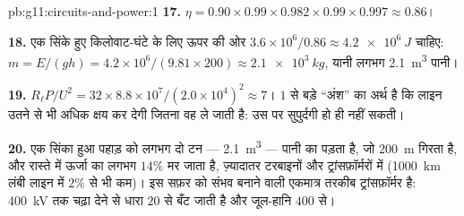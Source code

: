 \begin{solution}{pb:g11:circuits-and-power:1}
\textbf{17.} $\eta = 0.90 \times 0.99 \times 0.982 \times 0.99 \times
0.997 \approx 0.86$।

\textbf{18.} एक सिंके हुए किलोवाट-घंटे के लिए ऊपर की ओर $3.6\times10^{6}/0.86
\approx \qty{4.2e6}{J}$
चाहिए: $m = E/(gh) = 4.2\times10^{6}/(9.81
\times 200) \approx \qty{2.1e3}{kg}$, यानी लगभग \qty{2.1}{m^3} पानी।

\textbf{19.} $R_\ell P/U^2 = 32 \times 8.8\times10^{7}/(2.0\times
10^{4})^2 \approx 7$। $1$ से बड़े ``अंश'' का अर्थ है कि लाइन उतने से भी
अधिक क्षय कर देगी जितना वह ले जाती है: उस  पर सुपुर्दगी हो
ही नहीं सकती।

\textbf{20.} एक सिंका हुआ  पहाड़ को लगभग दो टन ---
\qty{2.1}{m^3} --- पानी का पड़ता है, जो \qty{200}{m} गिरता है, और रास्ते में
ऊर्जा का लगभग $14\%$ मर जाता है, ज़्यादातर टरबाइनों और
ट्रांसफ़ॉर्मरों में (\qty{1000}{km} लंबी लाइन में $2\%$ से भी कम)। इस सफ़र को
संभव बनाने वाली एकमात्र तरकीब ट्रांसफ़ॉर्मर है: \qty{400}{kV} तक चढ़ा देने से धारा
$20$ से बँट जाती है और जूल-हानि $400$ से।
\end{solution}
